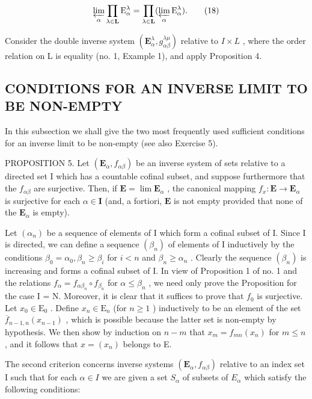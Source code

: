 \[
\varprojlim_ {\alpha} \prod_ {\lambda \in \mathbf {L}} \mathrm{E} _ {\alpha} ^ {\lambda} = \prod_ {\lambda \in \mathbf {L}} (\varprojlim_ {\alpha} \mathrm{E} _ {\alpha} ^ {\lambda}).\tag{18}
\]

Consider the double inverse system \((\mathbf{E}_{\alpha}^{\lambda}, g_{\alpha\beta}^{\lambda\mu})\) relative to \(I \times L\) , where the order relation on L is equality (no. 1, Example 1), and apply Proposition 4.

\subsection{CONDITIONS FOR AN INVERSE LIMIT TO BE NON-EMPTY}

In this subsection we shall give the two most frequently used sufficient conditions for an inverse limit to be non-empty (see also Exercise 5).

PROPOSITION 5. Let \((\mathbf{E}_{\alpha}, f_{\alpha \beta})\) be an inverse system of sets relative to a directed set I which has a countable cofinal subset, and suppose furthermore that the \(f_{\alpha \beta}\) are surjective. Then, if \(\mathbf{E} = \lim \mathbf{E}_{\alpha}\) , the canonical mapping \(f_{x}: \mathbf{E} \to \mathbf{E}_{\alpha}\) is surjective for each \(\alpha \in \mathbf{I}\) (and, a fortiori, \(\mathbf{E}\) is not empty provided that none of the \(\mathbf{E}_{\alpha}\) is empty).

Let \((\alpha_{n})\) be a sequence of elements of I which form a cofinal subset of I. Since I is directed, we can define a sequence \((\beta_{n})\) of elements of I inductively by the conditions \(\beta_{0} = \alpha_{0}, \beta_{n} \geqslant \beta_{i}\) for \(i < n\) and \(\beta_{n} \geqslant \alpha_{n}\) . Clearly the sequence \((\beta_{n})\) is increasing and forms a cofinal subset of I. In view of Proposition 1 of no. 1 and the relations \(f_{\alpha} = f_{\alpha \beta_{n}} \circ f_{\beta_{n}}\) for \(\alpha \leqslant \beta_{n}\) , we need only prove the Proposition for the case I = N. Moreover, it is clear that it suffices to prove that \(f_{0}\) is surjective. Let \(x_{0} \in \mathrm{E}_{0}\) . Define \(x_{n} \in \mathrm{E}_{n}\) (for \(n \geqslant 1\) ) inductively to be an element of the set \(\overline{f}_{n-1,n}(x_{n-1})\) , which is possible because the latter set is non-empty by hypothesis. We then show by induction on \(n - m\) that \(x_{m} = f_{mn}(x_{n})\) for \(m \leqslant n\) , and it follows that \(x = (x_{n})\) belongs to E.

The second criterion concerns inverse systems \((\mathbf{E}_{\alpha}, f_{\alpha\beta})\) relative to an index set I such that for each \(\alpha \in I\) we are given a set \(S_{\alpha}\) of subsets of \(E_{\alpha}\) which satisfy the following conditions:


